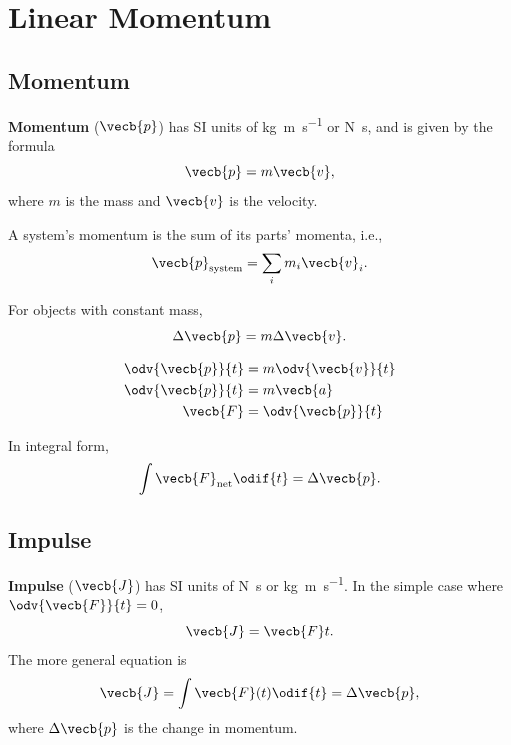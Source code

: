 
\chapter{Linear Momentum}


\section{Momentum}

\textbf{Momentum} (\(\vecb{p}\)) has SI units of \unit{\kilogram
\metre \per \second}
or \unit{\newton \second},
and is given by the formula
\begin{equation}
    \vecb{p} = m \vecb{v},
\end{equation}
where \(m\) is the mass and \(\vecb{v}\) is the velocity.

A system's momentum is the sum of its parts' momenta, i.e.,
\begin{equation}
    \vecb{p}_\mathrm{system} = \sum_i m_i \vecb{v}_i.
\end{equation}

For objects with constant mass,
\begin{equation}
    \Delta{\vecb{p}} = m \Delta{\vecb{v}}.
\end{equation}

\begin{equation} \label{eq:force-momentum}
    \begin{aligned}
        \odv{\vecb{p}}{t} &= m \odv{\vecb{v}}{t} \\
        \odv{\vecb{p}}{t} &= m \vecb{a} \\
        \vecb{F} &= \odv{\vecb{p}}{t}
    \end{aligned}
\end{equation}

In integral form,
\begin{equation}
    \int \vecb{F}_\mathrm{net} \odif{t} = \Delta{\vecb{p}}.
\end{equation}

\section{Impulse}

\textbf{Impulse} (\(\vecb{J}\)) has SI units of \unit{\newton \second}
or \unit{\kilogram \metre \per \second}.
In the simple case where \(\odv{\vecb{F}}{t} = 0\),
\begin{equation}
    \vecb{J} = \vecb{F} t.
\end{equation}
The more general equation is
\begin{equation}
    \vecb{J} = \int \vecb{F}(t) \odif{t} = \Delta{\vecb{p}},
\end{equation}
where \(\Delta{\vecb{p}}\) is the change in momentum.


